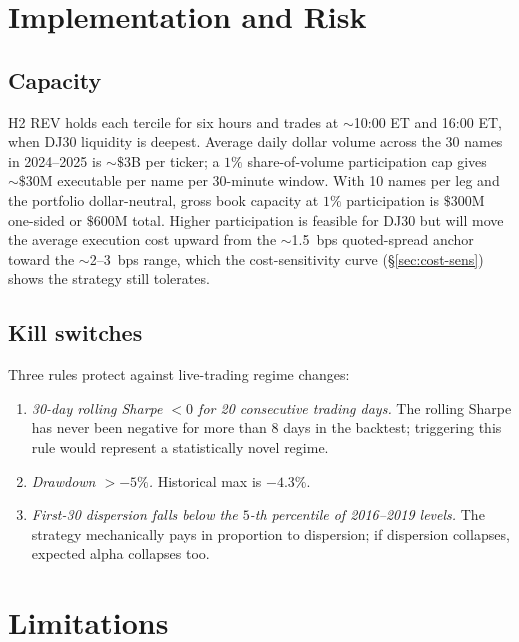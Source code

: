 \documentclass[10pt,conference,compsoc]{IEEEtran}
\begin{document}
\section{Implementation and Risk}
\label{sec:impl}

\subsection{Capacity}

H2 REV holds each tercile for six hours and trades at
$\sim$10:00 ET and 16:00 ET, when DJ30 liquidity is deepest.
Average daily dollar volume across the 30 names in 2024--2025 is
$\sim \$3$B per ticker; a $1\%$ share-of-volume participation
cap gives $\sim \$30$M executable per name per 30-minute
window. With 10 names per leg and the portfolio dollar-neutral,
gross book capacity at $1\%$ participation is $\$300$M one-sided
or $\$600$M total. Higher participation is feasible for DJ30 but
will move the average execution cost upward from the $\sim$1.5~bps
quoted-spread anchor toward the $\sim$2--3~bps range, which the
cost-sensitivity curve (\S\ref{sec:cost-sens}) shows the strategy
still tolerates.

\subsection{Kill switches}

Three rules protect against live-trading regime changes:

\begin{enumerate}[leftmargin=*]
  \item \emph{30-day rolling Sharpe $< 0$ for 20 consecutive
        trading days.} The rolling Sharpe has never been negative
        for more than 8 days in the backtest; triggering this
        rule would represent a statistically novel regime.
  \item \emph{Drawdown $> -5\%$.} Historical max is $-4.3\%$.
  \item \emph{First-30 dispersion falls below the $5$-th percentile
        of 2016--2019 levels.} The strategy mechanically pays in
        proportion to dispersion; if dispersion collapses,
        expected alpha collapses too.
\end{enumerate}

\section{Limitations}
\label{sec:limits}
\end{document}
